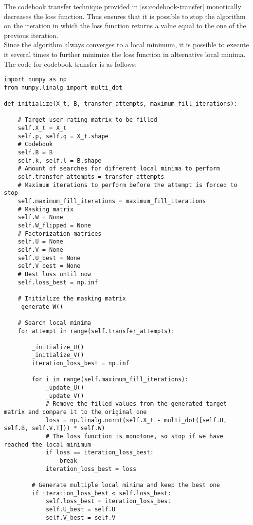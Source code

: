 The codebook transfer technique provided in \autoref{ss:codebook-transfer} monotically decreases the loss function. Thus ensures that it is possible to stop the algorithm on the iteration in which the loss function returns a value equal to the one of the previous iteration.\\
Since the algorithm always converges to a local minimum, it is possible to execute it several times to further minimize the loss function in alternative local minima.\\
The code for codebook transfer is as follows:
\begin{verbatim}
import numpy as np
from numpy.linalg import multi_dot

def initialize(X_t, B, transfer_attempts, maximum_fill_iterations):

    # Target user-rating matrix to be filled
    self.X_t = X_t
    self.p, self.q = X_t.shape
    # Codebook
    self.B = B
    self.k, self.l = B.shape
    # Amount of searches for different local minima to perform
    self.transfer_attempts = transfer_attempts
    # Maximum iterations to perform before the attempt is forced to stop
    self.maximum_fill_iterations = maximum_fill_iterations
    # Masking matrix
    self.W = None
    self.W_flipped = None
    # Factorization matrices
    self.U = None
    self.V = None
    self.U_best = None
    self.V_best = None
    # Best loss until now
    self.loss_best = np.inf

    # Initialize the masking matrix
    _generate_W()

    # Search local minima
    for attempt in range(self.transfer_attempts):

        _initialize_U()
        _initialize_V()
        iteration_loss_best = np.inf

        for i in range(self.maximum_fill_iterations):
            _update_U()
            _update_V()
            # Remove the filled values from the generated target matrix and compare it to the original one
            loss = np.linalg.norm((self.X_t - multi_dot([self.U, self.B, self.V.T])) * self.W)
            # The loss function is monotone, so stop if we have reached the local minimum
            if loss == iteration_loss_best:
                break
            iteration_loss_best = loss

        # Generate multiple local minima and keep the best one
        if iteration_loss_best < self.loss_best:
            self.loss_best = iteration_loss_best
            self.U_best = self.U
            self.V_best = self.V


\end{verbatim}
